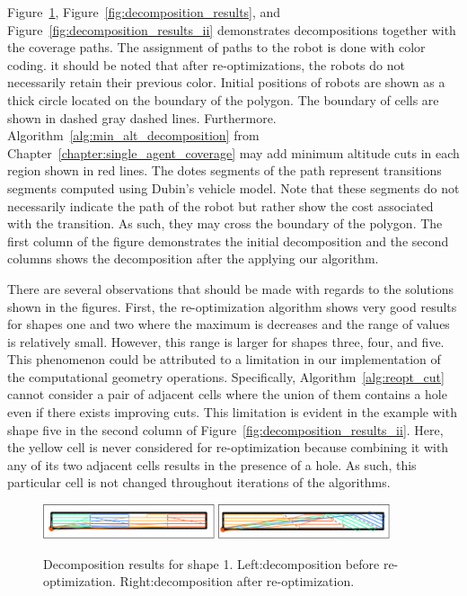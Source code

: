 \documentclass[../main.tex]{subfiles}
\begin{document}
Figure~\ref{fig:decomposition_demo}, Figure~\ref{fig:decomposition_results}, and Figure~\ref{fig:decomposition_results_ii} demonstrates decompositions together with the coverage paths. The assignment of paths to the robot is done with color coding. it should be noted that after re-optimizations, the robots do not necessarily retain their previous color. Initial positions of robots are shown as a thick circle located on the boundary of the polygon. The boundary of cells are shown in dashed gray dashed lines. Furthermore. Algorithm~\ref{alg:min_alt_decomposition} from Chapter~\ref{chapter:single_agent_coverage} may add minimum altitude cuts in each region shown in red lines. The dotes segments of the path represent transitions segments computed using Dubin's vehicle model. Note that these segments do not necessarily indicate the path of the robot but rather show the cost associated with the transition. As such, they may cross the boundary of the polygon. The first column of the figure demonstrates the initial decomposition and the second columns shows the decomposition after the applying our algorithm.

There are several observations that should be made with regards to the solutions shown in the figures. First, the re-optimization algorithm shows very good results for shapes one and two where the maximum is decreases and the range of values is relatively small. However, this range is larger for shapes three, four, and five. This phenomenon could be attributed to a limitation in our implementation of the computational geometry operations. Specifically, Algorithm~\ref{alg:reopt_cut} cannot consider a pair of adjacent cells where the union of them contains a hole even if there exists improving cuts. This limitation is evident in the example with shape five in the second column of Figure~\ref{fig:decomposition_results_ii}. Here, the yellow cell is never considered for re-optimization because combining it with any of its two adjacent cells results in the presence of a hole. As such, this particular cell is not changed throughout iterations of the algorithms.

\begin{figure}
	\centering
	\includegraphics[width=0.45\textwidth]{img/chapter_5/ID_1_orig.pdf}%
	\includegraphics[width=0.45\textwidth]{img/chapter_5/ID_1_reopt.pdf}

	\caption{Decomposition results for shape 1. Left:decomposition before re-optimization. Right:decomposition after re-optimization.}
	\label{fig:decomposition_demo}

\end{figure}
\end{document}

